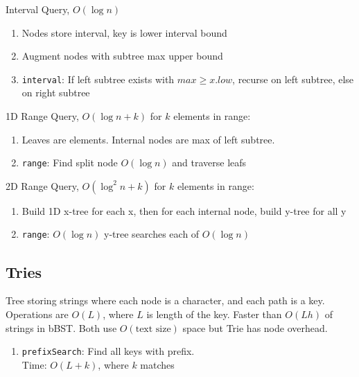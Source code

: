 \documentclass[12pt, a4paper]{article}
\begin{document}
\begin{multicols*}{3}
Interval Query, $O(\log n)$
\begin{enumerate}[\roman*.]
  \item Nodes store interval, key is lower interval bound
  \item Augment nodes with subtree max upper bound
  \item \lstinline|interval|: If left subtree exists with $max \geq x.low$, recurse on left subtree, else on right subtree
\end{enumerate}

1D Range Query, $O(\log n + k)$ for $k$ elements in range:
\begin{enumerate}[\roman*.]
  \item Leaves are elements. Internal nodes are max of left subtree.
  \item \lstinline|range|: Find split node $O(\log n)$ and traverse leafs
\end{enumerate}

2D Range Query, $O(\log^2 n + k)$ for $k$ elements in range:
\begin{enumerate}[\roman*.]
  \item Build 1D x-tree for each x, then for each internal node, build y-tree for all y
  \item \lstinline|range|: $O(\log n)$ y-tree searches each of $O(\log n)$ 
\end{enumerate}

\colbreak
\subsection{Tries}
Tree storing strings where each node is a character, and each path is a key. Operations are $O(L)$, where $L$ is length of the key. Faster than $O(Lh)$ of strings in bBST. Both use $O(\text{text size})$ space but Trie has node overhead.
\begin{enumerate}[\roman*.]
\item \lstinline|prefixSearch|: Find all keys with prefix.\\Time: $O(L + k)$, where $k$ matches
\end{enumerate}


\end{multicols*}
\end{document}
